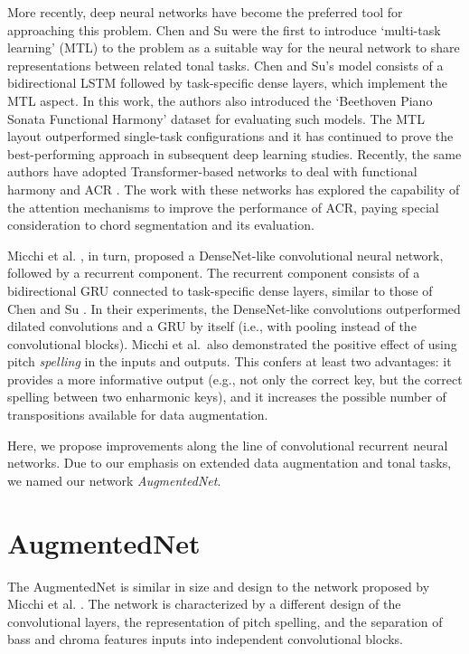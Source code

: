 \documentclass{article}
\newcommand{\guide}[1]{}
\begin{document}
\guide{Chen and Su (2018).}
More recently, deep neural networks have become the preferred tool for approaching this problem.
Chen and Su \cite{chen2018functional} were the first to introduce `multi-task learning' (MTL) \cite{ruder2017overview} to the problem as a suitable way for the neural network to share representations between related tonal tasks. 
Chen and Su's model consists of a bidirectional LSTM \cite{hochreiter1997long} followed by task-specific dense layers, which implement the MTL aspect.
In this work, the authors also introduced the `Beethoven Piano Sonata Functional Harmony' dataset for evaluating such models. 
The MTL layout outperformed single-task configurations and it has continued to prove the best-performing approach in subsequent deep learning studies. 
Recently, the same authors have adopted Transformer-based networks to deal with functional harmony and ACR \cite{chen2019harmony, chen2021attend}. 
The work with these networks has explored the capability of the attention mechanisms to improve the performance of ACR, paying special consideration to chord segmentation and its evaluation. 

\guide{Micchi et al (2020).}
Micchi et al. \cite{micchi2020not}, in turn, proposed a DenseNet-like \cite{huang2017densely} convolutional neural network, followed by a recurrent component.
The recurrent component consists of a bidirectional GRU \cite{cho2014learning} connected to task-specific dense layers, similar to those of Chen and Su \cite{chen2018functional}.
In their experiments, the DenseNet-like convolutions outperformed dilated convolutions and a GRU by itself (i.e., with pooling instead of the convolutional blocks).
Micchi et al.~also demonstrated the positive effect of using pitch \textit{spelling} in the inputs and outputs.
This confers at least two advantages: it provides a more informative output (e.g., not only the correct key, but the correct spelling between two enharmonic keys), and it increases the possible number of transpositions available for data augmentation.

\guide{Ours.}
Here, we propose improvements along the line of convolutional recurrent neural networks. Due to our emphasis on extended data augmentation and tonal tasks, we named our network \emph{AugmentedNet}.
 
\section{AugmentedNet}

The AugmentedNet is similar in size and design to the network proposed by Micchi et al. \cite{micchi2020not}. The network is characterized by a different design of the convolutional layers, the representation of pitch spelling, and the separation of bass and chroma features inputs into independent convolutional blocks.
\end{document}
